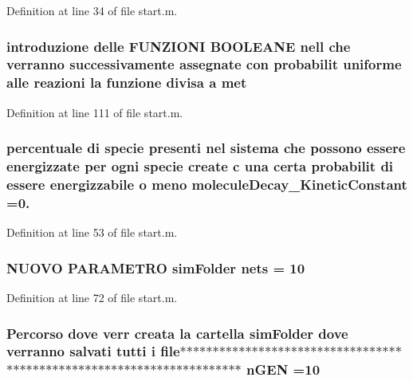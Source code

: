 Definition at line 34 of file start.\-m.

\hypertarget{a00071_a53f2a5c181e46a513a4e87f144d19f6b}{
\subsubsection[{met}]{\setlength{\rightskip}{0pt plus 5cm}introduzione delle F\-U\-N\-Z\-I\-O\-N\-I B\-O\-O\-L\-E\-A\-N\-E nell che verranno successivamente assegnate con probabilit uniforme alle {\bf reazioni} la funzione divisa {\bf a} met}}\label{a00071_a53f2a5c181e46a513a4e87f144d19f6b}


Definition at line 111 of file start.\-m.

\hypertarget{a00071_a85569bbcfd8fbc0081b5a144eaf516f5}{
\subsubsection[{molecule\-Decay\-\_\-\-Kinetic\-Constant}]{\setlength{\rightskip}{0pt plus 5cm}percentuale di specie presenti nel sistema che possono essere energizzate per ogni specie create {\bf c} una certa probabilit di essere energizzabile o meno molecule\-Decay\-\_\-\-Kinetic\-Constant =0.}}\label{a00071_a85569bbcfd8fbc0081b5a144eaf516f5}


Definition at line 53 of file start.\-m.

\hypertarget{a00071_a006c95919fb4982bffba044f13cd2a7f}{
\subsubsection[{nets}]{\setlength{\rightskip}{0pt plus 5cm}N\-U\-O\-V\-O P\-A\-R\-A\-M\-E\-T\-R\-O {\bf sim\-Folder} nets = 10}}\label{a00071_a006c95919fb4982bffba044f13cd2a7f}


Definition at line 72 of file start.\-m.

\hypertarget{a00071_a4c8fe523edbe179c5d215da13f469f72}{
\subsubsection[{n\-G\-E\-N}]{\setlength{\rightskip}{0pt plus 5cm}Percorso dove verr creata la cartella {\bf sim\-Folder} dove verranno salvati tutti {\bf i} {\bf file}$\ast$$\ast$$\ast$$\ast$$\ast$$\ast$$\ast$$\ast$$\ast$$\ast$$\ast$$\ast$$\ast$$\ast$$\ast$$\ast$$\ast$$\ast$$\ast$$\ast$$\ast$$\ast$$\ast$$\ast$$\ast$$\ast$$\ast$$\ast$$\ast$$\ast$$\ast$$\ast$$\ast$$\ast$$\ast$$\ast$$\ast$$\ast$$\ast$$\ast$$\ast$$\ast$$\ast$$\ast$$\ast$$\ast$$\ast$$\ast$$\ast$$\ast$$\ast$$\ast$$\ast$$\ast$$\ast$$\ast$$\ast$$\ast$$\ast$$\ast$$\ast$$\ast$$\ast$$\ast$$\ast$$\ast$$\ast$$\ast$$\ast$$\ast$ n\-G\-E\-N =10}}\label{a00071_a4c8fe523edbe179c5d215da13f469f72}


